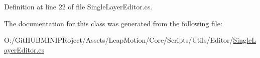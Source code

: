 Definition at line 22 of file Single\+Layer\+Editor.\+cs.



The documentation for this class was generated from the following file\+:\begin{DoxyCompactItemize}
\item 
O\+:/\+Git\+H\+U\+B\+M\+I\+N\+I\+P\+Roject/\+Assets/\+Leap\+Motion/\+Core/\+Scripts/\+Utils/\+Editor/\mbox{\hyperlink{_single_layer_editor_8cs}{Single\+Layer\+Editor.\+cs}}\end{DoxyCompactItemize}

